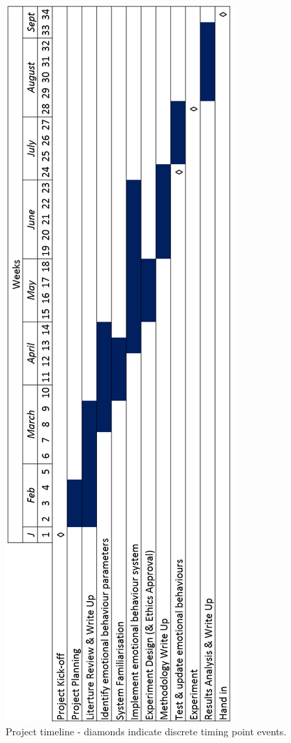 \documentclass[11pt]{article}
\begin{document}
\begin{figure}
\centering
\includegraphics[height=0.9\textheight,]{ProjectTimeline3.png}
\caption{Project timeline - diamonds indicate discrete timing point events.}
\label{fig:ProjectTimeline}
\end{figure}



\end{document}
